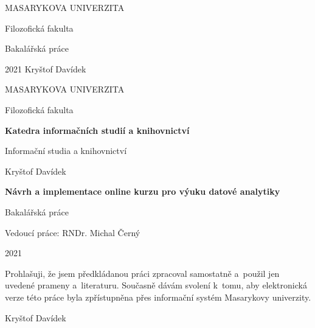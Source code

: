 \documentclass[a4paper,12pt,openany,twoside]{book} %
\begin{document}
	\clearpage


		\begin{center}
			{\Large\uppercase{Masarykova univerzita}}

			\vspace{2em}

			{\Large Filozofická fakulta}

			\vspace{20em}

			{\LARGE Bakalářská práce}

			\vfill
			    {\LARGE 2021}
			    \hfill
            	{\LARGE Kryštof Davídek}
		\end{center}

		\begin{center}
			{\Large\uppercase{Masarykova univerzita}}

			\vspace{2em}

			{\Large Filozofická fakulta}

			\vspace{5em}

			{\Large\bf Katedra informačních studií a knihovnictví}

			\vspace{2em}

			{\Large Informační studia a knihovnictví}

			\vspace{11em}

			{\large Kryštof Davídek }
			
			\vspace{3em}
			
			{\LARGE\bf Návrh a implementace online kurzu pro výuku datové analytiky}

			\vspace{1.5em}

			{\Large Bakalářská práce}

			\vfill
			\vspace{3em}
			{\large Vedoucí práce: RNDr. Michal Černý}
			\vspace{1em}
			
			{\large 2021}
		\end{center}
		
\newpage

\par
\par\vspace*{\fill}
	\pagestyle{plain}
\begin{flushright}
	Prohlašuji, že jsem předkládanou práci zpracoval samostatně a~použil jen uvedené prameny a~literaturu. Současně dávám svolení k~tomu, aby elektronická verze této práce byla zpřístupněna přes informační systém Masarykovy univerzity.

	\vspace{3em}

	    \makebox[2.5in][r]{\dotfill}
	    
	    Kryštof Davídek

	    \par

\end{flushright}
\clearpage
\end{document}
